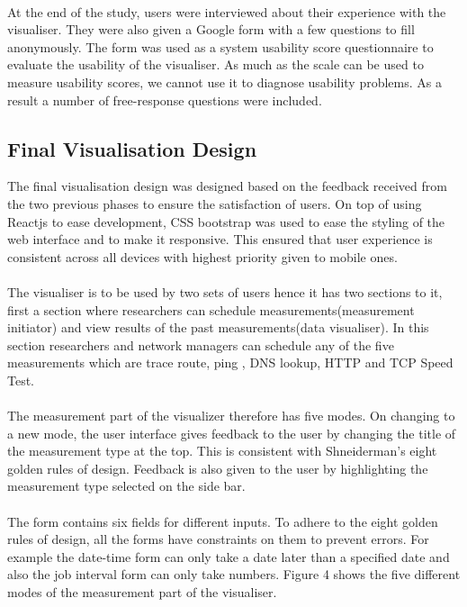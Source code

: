 \paragraph{}
At the end of the study, users were interviewed about their experience with the visualiser. They were also given a Google form with a few questions to fill anonymously. The form was used as a system usability score questionnaire to evaluate the usability of the visualiser. As much as the scale can be used to measure usability scores, we cannot use it to diagnose usability problems\cite{inproceedingsSauro}. As a result a number of free-response questions were included.
\subsection{Final Visualisation Design}
The final visualisation design was designed based on the feedback received from the two previous phases to ensure the satisfaction of users. On top of using Reactjs to ease development, CSS bootstrap was used to ease the styling of the web interface and to make it responsive. This ensured that user experience is consistent across all devices with highest priority given to mobile ones. 
\paragraph{}
The visualiser is to be used by two sets of users hence it has two sections to it, first a section where researchers can schedule measurements(measurement initiator) and view results of the past measurements(data visualiser). In this section researchers and network managers can schedule any of the five measurements which are trace route, ping , DNS lookup, HTTP and TCP  Speed Test. 
\paragraph{}
The measurement part of the visualizer therefore has five modes. On changing to a new mode, the user interface gives feedback to the user by changing the title of the measurement type at the top. This is consistent with Shneiderman's eight golden rules of design\cite{Shneiderman:2016:DUI:3033040}. Feedback is also given to the user by highlighting the measurement type selected on the side bar.
\paragraph{}
The form contains six fields for different inputs. To adhere to the eight golden rules of design, all the forms have constraints on them to prevent errors. For example the date-time form can only take a date later than a specified date and also the job interval form can only take numbers\cite{Shneiderman:2016:DUI:3033040}. Figure 4 shows the five different modes of the measurement part of the visualiser. 
